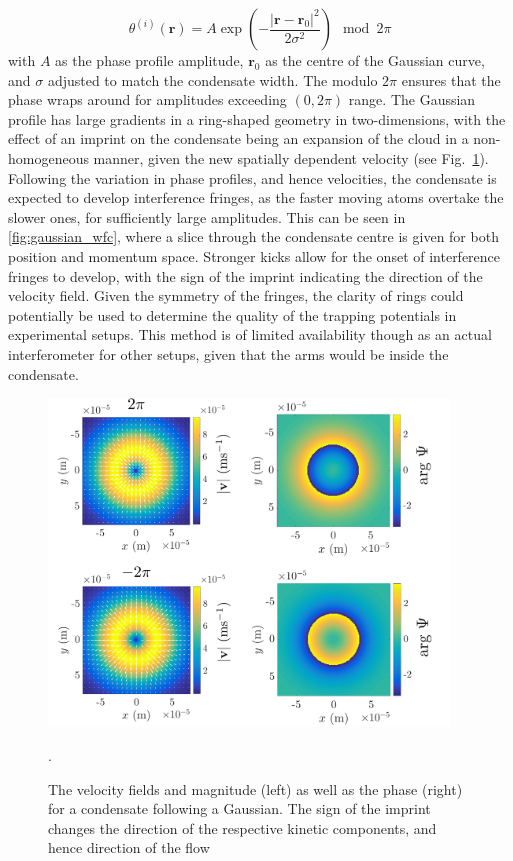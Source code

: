 \begin{equation}
    \theta^{(i)}(\mathbf{r}) = A\exp\left( -\frac{ |\mathbf{r}-\mathbf{r}_0|^2 }{2\sigma^2 } \right) \mod 2\pi
\end{equation}
with $A$ as the phase profile amplitude, $\mathbf{r}_0$ as the centre of the Gaussian curve, and $\sigma$ adjusted to match the condensate width. The modulo $2\pi$ ensures that the phase wraps around for amplitudes exceeding $(0,2\pi)$ range. The Gaussian profile has large gradients in a ring-shaped geometry in two-dimensions, with the effect of an imprint on the condensate being an expansion of the cloud in a non-homogeneous manner, given the new spatially dependent velocity (see Fig.~\ref{fig:gaussian}). Following the variation in phase profiles, and hence velocities, the condensate is expected to develop interference fringes, as the faster moving atoms overtake the slower ones, for sufficiently large amplitudes. This can be seen in \ref{fig:gaussian_wfc}, where a slice through the condensate centre is given for both position and momentum space. Stronger kicks allow for the onset of interference fringes to develop, with the sign of the imprint indicating the direction of the velocity field. Given the symmetry of the fringes, the clarity of rings could potentially be used to determine the quality of the trapping potentials in experimental setups. This method is of limited availability though as an actual interferometer for other setups, given that the arms would be inside the condensate.

\begin{figure}\centering
    \includegraphics[width=0.95\textwidth]{Images/ch4_vtx/velocity/gaussian_imprint}
    \caption{The velocity fields and magnitude (left) as well as the phase (right) for a condensate following a Gaussian. The sign of the imprint changes the direction of the respective kinetic components, and hence direction of the flow}.\label{fig:gaussian}
\end{figure}


